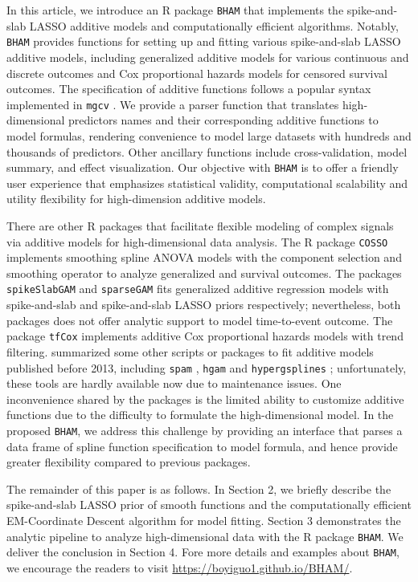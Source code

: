 \documentclass[
]{jss}
\begin{document}
In this article, we introduce an R package \texttt{BHAM} that implements
the spike-and-slab LASSO additive models and computationally efficient
algorithms. Notably, \texttt{BHAM} provides functions for setting up and
fitting various spike-and-slab LASSO additive models, including
generalized additive models for various continuous and discrete outcomes
and Cox proportional hazards models for censored survival outcomes. The
specification of additive functions follows a popular syntax implemented
in \texttt{mgcv} \citep{r_mgcv}. We provide a parser function that
translates high-dimensional predictors names and their corresponding
additive functions to model formulas, rendering convenience to model
large datasets with hundreds and thousands of predictors. Other
ancillary functions include cross-validation, model summary, and effect
visualization. Our objective with \texttt{BHAM} is to offer a friendly
user experience that emphasizes statistical validity, computational
scalability and utility flexibility for high-dimension additive models.

There are other R packages that facilitate flexible modeling of complex
signals via additive models for high-dimensional data analysis. The R
package \texttt{COSSO} \citep{r_cosso} implements smoothing spline ANOVA
models with the component selection and smoothing operator to analyze
generalized and survival outcomes. The packages \texttt{spikeSlabGAM}
\citep{r_spikeSlabGAM} and \texttt{sparseGAM} \citep{r_sparseGAM} fits
generalized additive regression models with spike-and-slab and
spike-and-slab LASSO priors respectively; nevertheless, both packages
does not offer analytic support to model time-to-event outcome. The
package \texttt{tfCox} \citep{r_tfCox} implements additive Cox
proportional hazards models with trend filtering. \cite{scheipl2013}
summarized some other scripts or packages to fit additive models
published before 2013, including \texttt{spam} \citep{ravikumar2009},
\texttt{hgam} \citep{meier2009} and \texttt{hypergsplines}
\citep{bove2011}; unfortunately, these tools are hardly available now
due to maintenance issues. One inconvenience shared by the packages is
the limited ability to customize additive functions due to the
difficulty to formulate the high-dimensional model. In the proposed
\texttt{BHAM}, we address this challenge by providing an interface that
parses a data frame of spline function specification to model formula,
and hence provide greater flexibility compared to previous packages.

The remainder of this paper is as follows. In Section 2, we briefly
describe the spike-and-slab LASSO prior of smooth functions and the
computationally efficient EM-Coordinate Descent algorithm for model
fitting. Section 3 demonstrates the analytic pipeline to analyze
high-dimensional data with the R package \texttt{BHAM}. We deliver the
conclusion in Section 4. Fore more details and examples about
\texttt{BHAM}, we encourage the readers to visit
\url{https://boyiguo1.github.io/BHAM/}.
\end{document}
